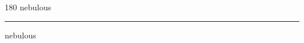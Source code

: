
\begin{frame}
\begin{center}
\begin{turn}{180}
{\fontsize{2.5cm}{1em}\selectfont nebulous}
\end{turn}
\vspace{1em}\par  
\hrule
\vspace{1em}\par  
{\fontsize{2.5cm}{1em}\selectfont nebulous}
\end{center}
\end{frame}
